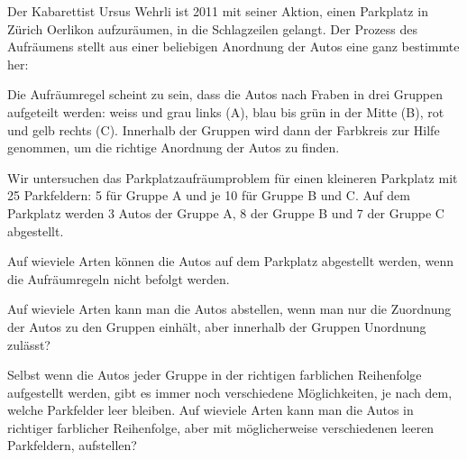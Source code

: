 Der Kabarettist Ursus Wehrli ist 2011 mit seiner Aktion,
einen Parkplatz in Zürich Oerlikon aufzuräumen, in die Schlagzeilen
gelangt.
Der Prozess des Aufräumens stellt aus einer beliebigen Anordnung der
Autos eine ganz bestimmte her:
\begin{center}
\end{center}
Die Aufräumregel scheint zu sein, dass die Autos nach Fraben in drei Gruppen
aufgeteilt werden: weiss und grau links (A),
blau bis grün in der Mitte (B), rot und gelb rechts (C). Innerhalb der Gruppen
wird dann der Farbkreis zur Hilfe genommen, um die richtige Anordnung
der Autos zu finden.

Wir untersuchen das Parkplatzaufräumproblem für einen kleineren
Parkplatz mit 25 Parkfeldern: 5 für Gruppe A und je 10 für Gruppe B und C.
Auf dem Parkplatz werden 3 Autos der Gruppe A, 8 der Gruppe B und 7 der
Gruppe C abgestellt.
\begin{teilaufgaben}
\item Auf wieviele Arten können die Autos auf dem Parkplatz abgestellt
werden, wenn die Aufräumregeln nicht befolgt werden.
\item Auf wieviele Arten kann man die Autos abstellen, wenn man nur
die Zuordnung der Autos zu den Gruppen einhält, aber innerhalb 
der Gruppen Unordnung zulässt?
\item Selbst wenn die Autos jeder Gruppe in der richtigen farblichen
Reihenfolge aufgestellt werden, gibt es immer noch verschiedene
Möglichkeiten, je nach dem, welche Parkfelder leer bleiben. Auf
wieviele Arten kann man die Autos in richtiger farblicher Reihenfolge,
aber mit möglicherweise verschiedenen leeren Parkfeldern, aufstellen?
\end{teilaufgaben}

